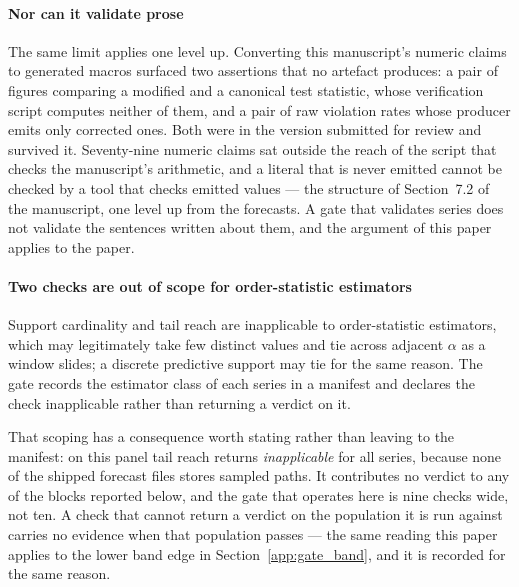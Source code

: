 \documentclass[preprint,11pt,authoryear]{elsarticle}
\newcommand{\1}{\boldsymbol{1}}
\begin{document}
\paragraph{Nor can it validate prose} The same limit applies one level up.
Converting this manuscript's numeric claims to generated macros surfaced two
assertions that no artefact produces: a pair of figures comparing a modified and
a canonical test statistic, whose verification script computes neither of them,
and a pair of raw violation rates whose producer emits only corrected ones. Both
were in the version submitted for review and survived it. Seventy-nine numeric claims sat outside the reach of the script that
checks the manuscript's arithmetic, and a literal that is never emitted cannot be
checked by a tool that checks emitted values --- the structure of
Section~7.2 of the manuscript, one level up from the forecasts. A gate that
validates series does not validate the sentences written about them, and the
argument of this paper applies to the paper.

\paragraph{Two checks are out of scope for order-statistic estimators} Support cardinality and tail reach
are inapplicable to order-statistic estimators, which may legitimately take few
distinct values and tie across adjacent $\alpha$ as a window slides; a discrete
predictive support may tie for the same reason. The gate records the estimator class of each
series in a manifest and declares the check inapplicable rather than returning a
verdict on it.

That scoping has a consequence worth stating rather than leaving to the
manifest: on this panel tail reach returns \emph{inapplicable} for all
\nGateSeries{} series, because none of the shipped forecast files stores sampled
paths. It contributes no verdict to any of the blocks reported below, and the
gate that operates here is nine checks wide, not ten. A check that cannot return
a verdict on the population it is run against carries no evidence when that
population passes --- the same reading this paper applies to the lower band edge
in Section~\ref{app:gate_band}, and it is recorded for the same reason.
\end{document}
